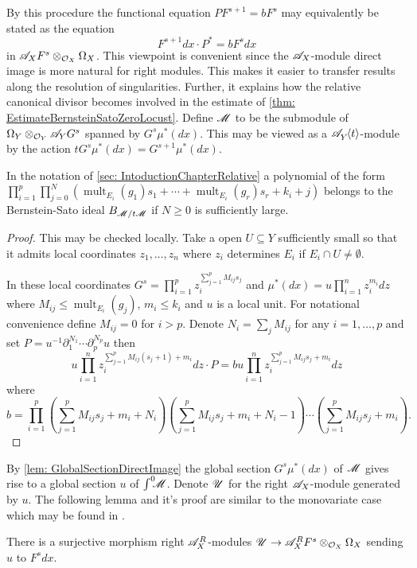 By this procedure the functional equation $P F^{s+1} = b F^s$ may equivalently be stated as the equation
$$F^{s+1}dx \cdot P^* = b F^s dx $$
in $\mathscr{A}_X F^s \otimes_{\mathcal{O}_X}\Omega_X$.
This viewpoint is convenient since the $\mathscr{A}_X$-module direct image is more natural for right modules.
This makes it easier to transfer results along the resolution of singularities.
Further, it explains how the relative canonical divisor becomes involved in the estimate of \cref{thm: EstimateBernsteinSatoZeroLocust}.
Define $\mathscr{M}$ to be the submodule of $\Omega_Y\otimes_{\mathcal{O}_Y} \mathscr{A}_Y G^s$ spanned by $G^s \mu^*(dx)$.
This may be viewed as a $\mathscr{A}_{Y}^{}\mkern-5mu\left\langle t \right\rangle$-module by the action $t G^s \mu^*(dx) = G^{s+1} \mu^*(dx)$.
\begin{lemma}\label{lem: BernsteinSatoPolynomialUpstairs}
  In the notation of \cref{sec: IntoductionChapterRelative} a polynomial of the form
  $\prod_{i=1}^p \prod_{j=0}^N(\operatorname{mult}_{E_i}(g_1) s_1 + \cdots + \operatorname{mult}_{E_i}(g_r)s_r + k_i + j)$
  belongs to the Bernstein-Sato ideal $B_{\mathscr{M}/t\mathscr{M}}$ if $N\geq 0$ is sufficiently large.
\end{lemma}
\begin{proof}
  This may be checked locally.
  Take a open $U\subseteq Y$ sufficiently small so that it admits local coordinates $z_1,\ldots,z_n$ where $z_i$ determines $E_i$ if $E_i\cap U \neq \emptyset$.

  In these local coordinates $G^s = \prod_{i=1}^p z_i^{\sum_{j=1}^p M_{ij}s_j}$ and $\mu^*(dx) = u \prod_{i=1}^n z_i^{m_i} dz$ where $M_{ij} \leq \operatorname{mult}_{E_i}(g_j)$, $m_i \leq k_i$ and $u$ is a local unit. For notational convenience define $M_{ij} = 0$ for $i>p$.
  Denote $N_i = \sum_j M_{ij}$ for any $i=1,\ldots,p$ and set $P = u^{-1} \partial_1^{N_1} \cdots \partial_p^{N_p} u$ then
  $$u\prod_{i=1}^n z_i^{\sum_{j=1}^p M_{ij}(s_j+1) + m_i}dz \cdot P =  b u \prod_{i=1}^nz_i^{\sum_{j=1}^p M_{ij}s_j + m_i}dz $$
  where
  $$b = \prod_{i=1}^p(\sum_{j=1}^p M_{ij}s_j + m_i + N_i)(\sum_{j=1}^p M_{ij}s_j + m_i + N_i - 1)\cdots(\sum_{j=1}^p M_{ij}s_j + m_i).$$
\end{proof}
By \cref{lem: GlobalSectionDirectImage} the global section $G^s \mu^*(dx)$ of $\mathscr{M}$ gives rise to a global section $u$ of $\int^0 \mkern -8mu\mathscr{M}$. Denote $\mathscr{U}$ for the right $\mathscr{A}_X$-module generated by $u$.
The following lemma and it's proof are similar to the monovariate case which may be found in \cite[p246]{bjork1979rings}.
\begin{lemma}
  There is a surjective morphism right $\mathscr{A}_X^R$-modules $\mathscr{U}\to \mathscr{A}_X^RF^s \otimes_{\mathcal{O}_X}\Omega_X$ sending $u$ to $F^sdx$.
\end{lemma}
